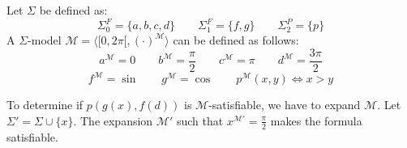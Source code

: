 \begin{example}
    Let $\Sigma$ be defined as:
    \[ \Sigma^F_0 = \{ a, b, c, d \} \hspace{2em} \Sigma^F_1 = \{ f, g \} \hspace{2em} \Sigma^P_2 = \{ p \} \]
    A $\Sigma$-model $\mathcal{M} = \langle [0, 2\pi[, (\cdot)^\mathcal{M} \rangle$ can be defined as follows:
    \[ a^\mathcal{M} = 0 \hspace{2em} b^\mathcal{M} = \frac{\pi}{2} \hspace{2em} c^\mathcal{M} = \pi \hspace{2em} d^\mathcal{M} = \frac{3\pi}{2} \]
    \[ f^\mathcal{M} = \sin \hspace{2em} g^\mathcal{M} = \cos \hspace{2em} p^\mathcal{M}(x, y) \iff x > y \]

    To determine if $p(g(x), f(d))$ is $\mathcal{M}$-satisfiable, we have to expand $\mathcal{M}$.
    Let $\Sigma' = \Sigma \cup \{ x \}$. The expansion $\mathcal{M}'$ such that $x^{\mathcal{M}'} = \frac{\pi}{2}$ makes the formula satisfiable.
\end{example}



